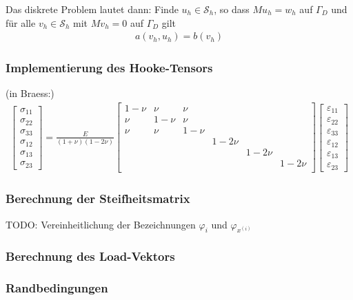\documentclass{scrartcl}
\def\e{\varepsilon}
\newcommand{\cS}{\mathcal{S}}
\newcommand{\vect}[1]{\begin{bmatrix} #1 \end{bmatrix}}
\begin{document}
Das diskrete Problem lautet dann:
Finde $u_h\in\cS_h$, so dass $Mu_h=w_h$ auf $\Gamma_D$ und für alle $v_h\in\cS_h$ mit $Mv_h=0$ auf $\Gamma_D$ gilt
\begin{align*}
	a(v_h,u_h) = b(v_h)
\end{align*}

\subsubsection*{Implementierung des Hooke-Tensors}


(in Braess:)
\begin{align*}
	\vect{\sigma_{11} \\ \sigma_{22} \\ \sigma_{33} \\ \sigma_{12} \\ \sigma_{13} \\ \sigma_{23}}
	= \frac{E}{(1+\nu)(1-2\nu)}\begin{bmatrix}
		1-\nu & \nu & \nu & & & \\
		\nu & 1-\nu & \nu & & & \\
		\nu & \nu & 1-\nu & & & \\
		& & & 1-2\nu & & \\
		& & & & 1-2\nu & \\
		& & & & & 1-2\nu \\
	\end{bmatrix}
	\vect{\e_{11} \\ \e_{22} \\ \e_{33} \\ \e_{12} \\ \e_{13} \\ \e_{23}}
\end{align*}

\subsubsection*{Berechnung der Steifheitsmatrix}
TODO: Vereinheitlichung der Bezeichnungen $\varphi_i$ und $\varphi_{x^{(i)}}$

\subsubsection*{Berechnung des Load-Vektors}


\subsubsection*{Randbedingungen}
\end{document}
